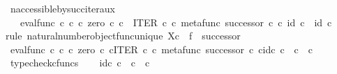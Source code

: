 \begin{isabellebody}
\ n{\isacharunderscore}{\kern0pt}accessible{\isacharunderscore}{\kern0pt}by{\isacharunderscore}{\kern0pt}succ{\isacharunderscore}{\kern0pt}iter{\isacharunderscore}{\kern0pt}aux{\isacharcolon}{\kern0pt}\isanewline
\ \ \ {\isachardoublequoteopen}eval{\isacharunderscore}{\kern0pt}func\ {\isasymnat}\isactrlsub c\ {\isasymnat}\isactrlsub c\ {\isasymcirc}\isactrlsub c\ {\isasymlangle}zero\ {\isasymcirc}\isactrlsub c\ {\isasymbeta}\isactrlbsub {\isasymnat}\isactrlsub c\isactrlesub {\isacharcomma}{\kern0pt}\ \ ITER\ {\isasymnat}\isactrlsub c\ {\isasymcirc}\isactrlsub c\ {\isasymlangle}{\isacharparenleft}{\kern0pt}metafunc\ successor{\isacharparenright}{\kern0pt}\ {\isasymcirc}\isactrlsub c\ {\isasymbeta}\isactrlbsub {\isasymnat}\isactrlsub c\isactrlesub \ {\isacharcomma}{\kern0pt}id\ {\isasymnat}\isactrlsub c{\isasymrangle}{\isasymrangle}\ {\isacharequal}{\kern0pt}\ id\ {\isasymnat}\isactrlsub c{\isachardoublequoteclose}\isanewline
%
\isadelimproof
%
\endisadelimproof
%
\isatagproof
{}\isamarkupfalse%
{\isacharparenleft}{\kern0pt}rule\ natural{\isacharunderscore}{\kern0pt}number{\isacharunderscore}{\kern0pt}object{\isacharunderscore}{\kern0pt}func{\isacharunderscore}{\kern0pt}unique{\isacharbrackleft}{\kern0pt}\ X{\isacharequal}{\kern0pt}{\isachardoublequoteopen}{\isasymnat}\isactrlsub c{\isachardoublequoteclose}{\isacharcomma}{\kern0pt}\ \ f\ {\isacharequal}{\kern0pt}\ successor{\isacharbrackright}{\kern0pt}{\isacharparenright}{\kern0pt}\isanewline
\ \ \isamarkupfalse%
\ {\isachardoublequoteopen}eval{\isacharunderscore}{\kern0pt}func\ {\isasymnat}\isactrlsub c\ {\isasymnat}\isactrlsub c\ {\isasymcirc}\isactrlsub c\ {\isasymlangle}zero\ {\isasymcirc}\isactrlsub c\ {\isasymbeta}\isactrlbsub {\isasymnat}\isactrlsub c\isactrlesub {\isacharcomma}{\kern0pt}ITER\ {\isasymnat}\isactrlsub c\ {\isasymcirc}\isactrlsub c\ {\isasymlangle}metafunc\ successor\ {\isasymcirc}\isactrlsub c\ {\isasymbeta}\isactrlbsub {\isasymnat}\isactrlsub c\isactrlesub {\isacharcomma}{\kern0pt}id\isactrlsub c\ {\isasymnat}\isactrlsub c{\isasymrangle}{\isasymrangle}\ {\isacharcolon}{\kern0pt}\ {\isasymnat}\isactrlsub c\ {\isasymrightarrow}\ {\isasymnat}\isactrlsub c{\isachardoublequoteclose}\isanewline
\ \ \ \ \isamarkupfalse%
\ typecheck{\isacharunderscore}{\kern0pt}cfuncs\isanewline
\ \ \isamarkupfalse%
\ {\isachardoublequoteopen}id\isactrlsub c\ {\isasymnat}\isactrlsub c\ {\isacharcolon}{\kern0pt}\ {\isasymnat}\isactrlsub c\ {\isasymrightarrow}\ {\isasymnat}\isactrlsub c{\isachardoublequoteclose}\isanewline

\end{isabellebody}
